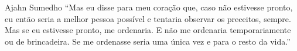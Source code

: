 
\begin{quotepage}{0.6\linewidth}{Ajahn Sumedho}
“Mas eu disse para meu coração que, caso não estivesse pronto, eu então
seria a melhor pessoa possível e tentaria observar os preceitos,
sempre. Mas se eu estivesse pronto, me ordenaria. E não me ordenaria
temporariamente ou de brincadeira. Se me ordenasse seria uma única vez
e para o resto da vida.”
\end{quotepage}

